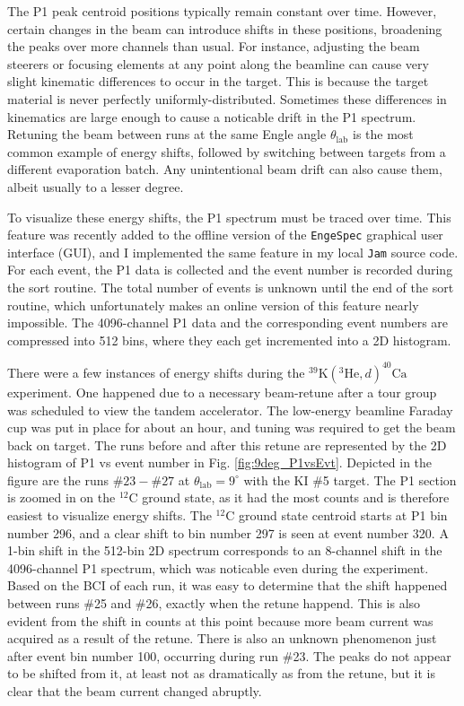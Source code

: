 The P1 peak centroid positions typically remain constant over time. However, certain changes in the beam can introduce shifts in these positions, broadening the peaks over more channels than usual. For instance, adjusting the beam steerers or focusing elements at any point along the beamline can cause very slight kinematic differences to occur in the target. This is because the target material is never perfectly uniformly-distributed. Sometimes these differences in kinematics are large enough to cause a noticable drift in the P1 spectrum. Retuning the beam between runs at the same Engle angle $\theta_{\mathrm{lab}}$ is the most common example of energy shifts, followed by switching between targets from a different evaporation batch. Any unintentional beam drift can also cause them, albeit usually to a lesser degree.

To visualize these energy shifts, the P1 spectrum must be traced over time. This feature was recently added to the offline version of the \texttt{EngeSpec} \cite{EngeSpec} graphical user interface (GUI), and I implemented the same feature in my local \texttt{Jam} source code. For each event, the P1 data is collected and the event number is recorded during the sort routine. The total number of events is unknown until the end of the sort routine, which unfortunately makes an online version of this feature nearly impossible. The 4096-channel P1 data and the corresponding event numbers are compressed into 512 bins, where they each get incremented into a 2D histogram.

There were a few instances of energy shifts during the $^{39}\mathrm{K}(^{3}\mathrm{He},d)^{40}\mathrm{Ca}$ experiment. One happened due to a necessary beam-retune after a tour group was scheduled to view the tandem accelerator. The low-energy beamline Faraday cup was put in place for about an hour, and tuning was required to get the beam back on target. The runs before and after this retune are represented by the 2D histogram of P1 vs event number in Fig. \ref{fig:9deg_P1vsEvt}. Depicted in the figure are the runs $\#23-\#27$ at $\theta_{\mathrm{lab}} = 9^{\circ}$ with the KI $\#$5 target. The P1 section is zoomed in on the $^{12}$C ground state, as it had the most counts and is therefore easiest to visualize energy shifts. The $^{12}$C ground state centroid starts at P1 bin number 296, and a clear shift to bin number 297 is seen at event number 320. A 1-bin shift in the 512-bin 2D spectrum corresponds to an 8-channel shift in the 4096-channel P1 spectrum, which was noticable even during the experiment. Based on the BCI of each run, it was easy to determine that the shift happened between runs $\#$25 and $\#$26, exactly when the retune happend. This is also evident from the shift in counts at this point because more beam current was acquired as a result of the retune. There is also an unknown phenomenon just after event bin number 100, occurring during run $\#$23. The peaks do not appear to be shifted from it, at least not as dramatically as from the retune, but it is clear that the beam current changed abruptly.


